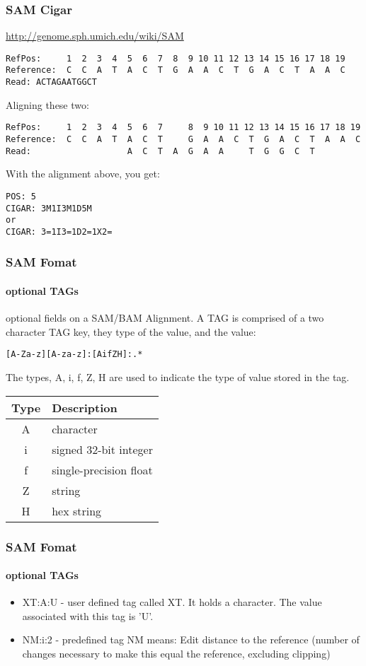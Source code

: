 \documentclass{beamer}
\begin{document}
\begin{frame} [fragile]
\frametitle{SAM Cigar}
\url{http://genome.sph.umich.edu/wiki/SAM}
\begin{tiny}
\begin{verbatim}
RefPos:     1  2  3  4  5  6  7  8  9 10 11 12 13 14 15 16 17 18 19
Reference:  C  C  A  T  A  C  T  G  A  A  C  T  G  A  C  T  A  A  C
Read: ACTAGAATGGCT
\end{verbatim}
\end{tiny}

Aligning these two:
\begin{tiny}
\begin{verbatim}
RefPos:     1  2  3  4  5  6  7     8  9 10 11 12 13 14 15 16 17 18 19
Reference:  C  C  A  T  A  C  T     G  A  A  C  T  G  A  C  T  A  A  C
Read:                   A  C  T  A  G  A  A     T  G  G  C  T
\end{verbatim}
\end{tiny}
With the alignment above, you get:
\begin{verbatim}
POS: 5
CIGAR: 3M1I3M1D5M
or
CIGAR: 3=1I3=1D2=1X2=
\end{verbatim}
\end{frame}


\begin{frame}[fragile]
\frametitle{SAM Fomat}
\framesubtitle{optional TAGs}
optional fields on a SAM/BAM Alignment. A TAG is comprised of a two character TAG key, they type of the value, and the value:
\begin{verbatim}
[A-Za-z][A-za-z]:[AifZH]:.*
\end{verbatim}
The types, A, i, f, Z, H are used to indicate the type of value stored in the tag.\\
\begin{small}
\begin{tabular}{cl}
\hline
Type &	Description\\
\hline
A &	character\\
i &	signed 32-bit integer\\
f &	single-precision float\\
Z &	string\\
H &	hex string\\
\hline
\end{tabular}
\end{small}
\end{frame}

\begin{frame}[fragile]
\frametitle{SAM Fomat}
\framesubtitle{optional TAGs}
\begin{itemize}
\item XT:A:U  - user defined tag called XT.  It holds a character.  The value associated with this tag is 'U'.
\item NM:i:2  - predefined tag NM means: Edit distance to the reference (number of changes necessary to make this equal the reference, excluding clipping)
\end{itemize}
\end{frame}
\end{document}
